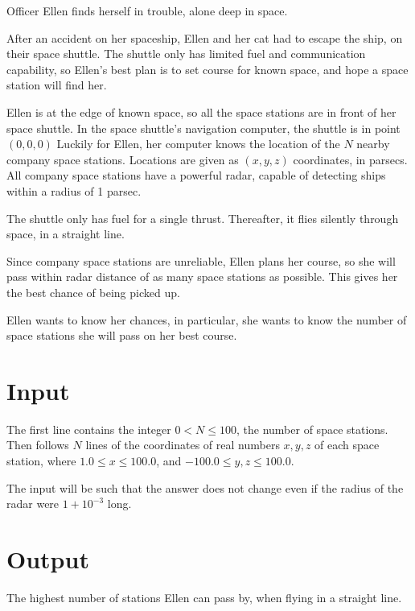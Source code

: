 
Officer Ellen finds herself in trouble, alone deep in space.

After an accident on her spaceship, Ellen and her cat had to escape the ship, on their space shuttle.
The shuttle only has limited fuel and communication capability, so Ellen's best plan is to set course for known space, and hope a space station will find her.

Ellen is at the edge of known space, so all the space stations are in front of her space shuttle.
In the space shuttle's navigation computer, the shuttle is in point $(0,0,0)$
Luckily for Ellen, her computer knows the location of the $N$ nearby company space stations.
Locations are given as $(x,y,z)$ coordinates, in parsecs.
All company space stations have a powerful radar, capable of detecting ships within a radius of 1 parsec.

The shuttle only has fuel for a single thrust.
Thereafter, it flies silently through space, in a straight line.

Since company space stations are unreliable, Ellen plans her course, so she will pass within radar distance of as many space stations as possible.
This gives her the best chance of being picked up.

Ellen wants to know her chances, in particular, she wants to know the number of space stations she will pass on her best course.

\section*{Input}
The first line contains the integer $0<N\leq100$, the number of space stations.
Then follows $N$ lines of the coordinates of real numbers $x, y, z$ of each space station, where $1.0\leq x\leq100.0$, and $-100.0\leq y,z \leq 100.0$.

The input will be such that the answer does not change even if the radius of the radar were 
$1+10^{-3}$ long.

\section*{Output}
The highest number of stations Ellen can pass by, when flying in a straight line.
